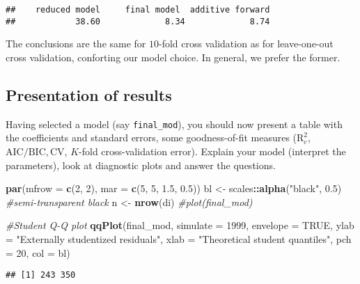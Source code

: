 \documentclass[]{book}
\newenvironment{Shaded}{\begin{snugshade}}{\end{snugshade}}
\newcommand{\CommentTok}[1]{\textcolor[rgb]{0.56,0.35,0.01}{\textit{#1}}}
\newcommand{\DataTypeTok}[1]{\textcolor[rgb]{0.13,0.29,0.53}{#1}}
\newcommand{\DecValTok}[1]{\textcolor[rgb]{0.00,0.00,0.81}{#1}}
\newcommand{\FloatTok}[1]{\textcolor[rgb]{0.00,0.00,0.81}{#1}}
\newcommand{\KeywordTok}[1]{\textcolor[rgb]{0.13,0.29,0.53}{\textbf{#1}}}
\newcommand{\NormalTok}[1]{#1}
\newcommand{\OperatorTok}[1]{\textcolor[rgb]{0.81,0.36,0.00}{\textbf{#1}}}
\newcommand{\OtherTok}[1]{\textcolor[rgb]{0.56,0.35,0.01}{#1}}
\newcommand{\StringTok}[1]{\textcolor[rgb]{0.31,0.60,0.02}{#1}}
\theoremstyle{definition}
\theoremstyle{definition}
\theoremstyle{definition}
\theoremstyle{remark}
\begin{document}
\begin{verbatim}
##    reduced model     final model  additive forward 
##            38.60             8.34             8.74
\end{verbatim}

The conclusions are the same for \(10\)-fold cross validation as for leave-one-out cross validation, conforting our model choice. In general, we prefer the former.

\hypertarget{presentation-of-results}{%
\subsection{Presentation of results}\label{presentation-of-results}}

Having selected a model (say \texttt{final\_mod}), you should now present a table with the coefficients and standard errors, some goodness-of-fit measures (\(\mathrm{R}^2_c\), \(\mathrm{AIC}/\mathrm{BIC}, \mathrm{CV}\), \(K\)-fold cross-validation error). Explain your model (interpret the parameters), look at diagnostic plots and answer the questions.

\begin{Shaded}
\begin{Highlighting}[]
\KeywordTok{par}\NormalTok{(}\DataTypeTok{mfrow =} \KeywordTok{c}\NormalTok{(}\DecValTok{2}\NormalTok{, }\DecValTok{2}\NormalTok{), }\DataTypeTok{mar =} \KeywordTok{c}\NormalTok{(}\DecValTok{5}\NormalTok{, }\DecValTok{5}\NormalTok{, }\FloatTok{1.5}\NormalTok{, }\FloatTok{0.5}\NormalTok{))}
\NormalTok{bl <-}\StringTok{ }\NormalTok{scales}\OperatorTok{::}\KeywordTok{alpha}\NormalTok{(}\StringTok{"black"}\NormalTok{, }\FloatTok{0.5}\NormalTok{) }\CommentTok{#semi-transparent black}
\NormalTok{n <-}\StringTok{ }\KeywordTok{nrow}\NormalTok{(di)}
\CommentTok{#plot(final_mod)}

\CommentTok{#Student Q-Q plot}
\KeywordTok{qqPlot}\NormalTok{(final_mod, }\DataTypeTok{simulate =} \DecValTok{1999}\NormalTok{, }\DataTypeTok{envelope =} \OtherTok{TRUE}\NormalTok{,}
       \DataTypeTok{ylab =} \StringTok{"Externally studentized residuals"}\NormalTok{, }
       \DataTypeTok{xlab =} \StringTok{"Theoretical student quantiles"}\NormalTok{, }
       \DataTypeTok{pch =} \DecValTok{20}\NormalTok{, }\DataTypeTok{col =}\NormalTok{ bl)}
\end{Highlighting}
\end{Shaded}

\begin{verbatim}
## [1] 243 350
\end{verbatim}
\end{document}
